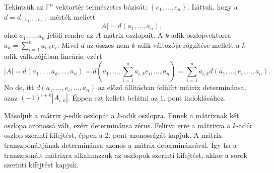 \documentclass[9pt, a4paper, showtrims]{memoir}
\makeatletter
\renewenvironment{proof}[1][\proofname]
    {\par\pushQED{\qed}%
    \normalfont \topsep6\p@\@plus6\p@\relax
    \trivlist
    \item[\hskip\labelsep
        \itshape
    #1\@addpunct{:}]\ignorespaces}
    {\popQED\endtrivlist\@endpefalse}
\theoremstyle{plain}
\theoremstyle{remark}
\theoremstyle{definition}
\makeatother
\begin{document}
\begin{proof}
	Tekintsük az $\mathbb{F}^n$ vektortér természetes bázisát:
	$\left\{e_1,\ldots,e_n\right\}$. Láttuk, hogy a $d=d_{\left\{ e_1,\ldots,e_n\right\}}$
	mérték mellett
	\[
		|A|=d\left( a_1,\ldots,a_n \right),
	\]
	ahol $a_1,\ldots,a_n$ jelöli rendre az $A$ mátrix oszlopait.
	A $k$-adik oszlopvektorra $a_k=\sum_{i=1}^na_{i,k}e_i$.
	Mivel $d$ az összes nem $k$-adik változója rögzítése mellett a $k$-adik változójában lineáris,
	ezért
	\[
		|A|=d\left( a_1,\ldots,a_k,\ldots,a_n \right)
		=
		d\left( a_1,\ldots,\sum_{i=1}^na_{i,k}e_i,\ldots,a_n \right)
		=
		\sum_{i=1}^na_{i,k}d(a_1,\ldots,e_i,\ldots,a_n).
	\]
	No de, itt $d(a_1,\ldots,e_i,\ldots,a_n)$ az előző állításban felülírt mátrix determinánsa,
	azaz $\left( -1 \right)^{i+k}|A_{i,k}|$.
	Éppen ezt kellett belátni az 1. pont indoklásához.

	Másoljuk a mátrix $j$-edik oszlopát a $k$-adik oszlopra.
	Ennek a mátrixnak két oszlopa azonossá vált,
	ezért determinánsa zérus.
	Felírva erre a mátrixra a $k$-adik oszlop szerinti kifejtést,
	éppen a 2. pont azonosságát kapjuk.
\end{proof}
A mátrix transzponáltjának determinánsa azonos a mátrix determinánsával.
Így ha a transzponált mátrixra alkalmazzuk az oszlopok szerinti kifejtést,
akkor a sorok szerinti kifejtést kapjuk.
\end{document}
